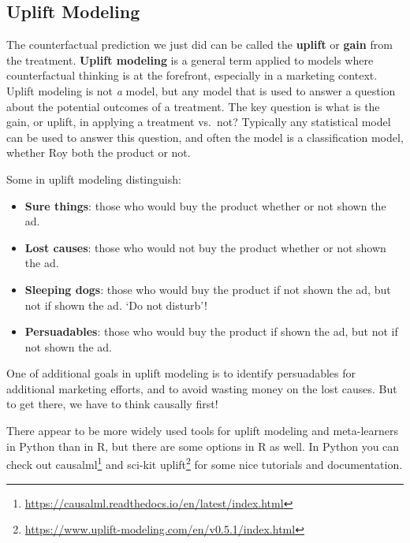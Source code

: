 \documentclass[
  letterpaper,
]{krantz}
\providecommand{\tightlist}{%
  \setlength{\itemsep}{0pt}\setlength{\parskip}{0pt}}\usepackage{longtable,booktabs,array}
\DeclareRobustCommand{\href}[2]{#2\footnote{\url{#1}}}
\begin{document}
\subsection{Uplift Modeling}\label{uplift-modeling}

The counterfactual prediction we just did can be called the
\textbf{uplift} or \textbf{gain} from the treatment. \textbf{Uplift
modeling} is a general term applied to models where counterfactual
thinking is at the forefront, especially in a marketing context. Uplift
modeling is not \emph{a} model, but any model that is used to answer a
question about the potential outcomes of a treatment. The key question
is what is the gain, or uplift, in applying a treatment vs.~not?
Typically any statistical model can be used to answer this question, and
often the model is a classification model, whether Roy both the product
or not.

Some in uplift modeling distinguish:

\begin{itemize}
\tightlist
\item
  \textbf{Sure things}: those who would buy the product whether or not
  shown the ad.
\item
  \textbf{Lost causes}: those who would not buy the product whether or
  not shown the ad.
\item
  \textbf{Sleeping dogs}: those who would buy the product if not shown
  the ad, but not if shown the ad. `Do not disturb'!
\item
  \textbf{Persuadables}: those who would buy the product if shown the
  ad, but not if not shown the ad.
\end{itemize}

One of additional goals in uplift modeling is to identify persuadables
for additional marketing efforts, and to avoid wasting money on the lost
causes. But to get there, we have to think causally first!

\begin{tcolorbox}[enhanced jigsaw, colback=white, toprule=.15mm, colframe=quarto-callout-tip-color-frame, breakable, leftrule=.75mm, bottomrule=.15mm, opacityback=0, left=2mm, rightrule=.15mm, arc=.35mm]
\begin{minipage}[t]{5.5mm}
\textcolor{quarto-callout-tip-color}{\faLightbulb}
\end{minipage}%
\begin{minipage}[t]{\textwidth - 5.5mm}

There appear to be more widely used tools for uplift modeling and
meta-learners in Python than in R, but there are some options in R as
well. In Python you can check out
\href{https://causalml.readthedocs.io/en/latest/index.html}{causalml}
and \href{https://www.uplift-modeling.com/en/v0.5.1/index.html}{sci-kit
uplift} for some nice tutorials and documentation.

\end{minipage}%
\end{tcolorbox}
\end{document}
